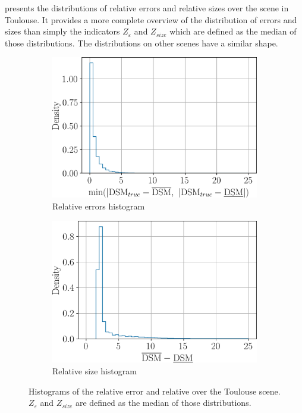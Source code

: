  presents the distributions of relative errors and relative sizes over the scene in Toulouse. It provides a more complete overview of the distribution of errors and sizes than simply the indicators $Z_\varepsilon$ and $Z_{size}$ which are defined as the median of those distributions. The distributions on other scenes have a similar shape. 
\begin{figure}
    \centering
    \begin{subfigure}[t]{0.5\linewidth}
        \flushright
        \includegraphics[width=\linewidth]{Images/Chap_6/histogram_elevation_eps_Toulouse.png}
        \caption{Relative errors histogram}
        \label{fig:error_hist}
    \end{subfigure}\centering
    \begin{subfigure}[t]{0.5\linewidth}
        \flushright
        \includegraphics[width=\linewidth]{Images/Chap_6/histogram_elevation_s_rel_Toulouse.png}
        \caption{Relative size histogram}
        \label{fig:size_hist}
    \end{subfigure}
    \caption{Histograms of the relative error and relative over the Toulouse scene. $Z_{\varepsilon}$ and $Z_{size}$ are defined as the median of those distributions.}
    \label{fig:histogram_elevation_toulouse}
\end{figure}


